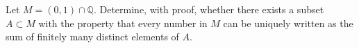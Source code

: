 Let $M=(0,1)\cap \mathbb Q$. Determine, with proof, whether there exists a subset $A\subset M$ with the property that every number in $M$ can be uniquely written as the sum of finitely many distinct elements of $A$.